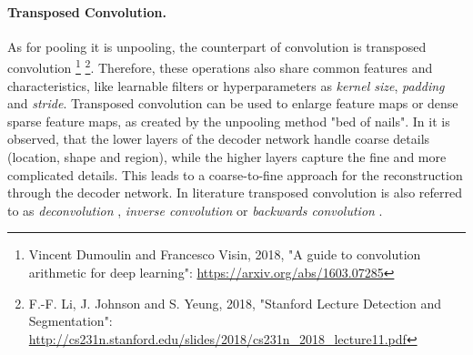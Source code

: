 
\paragraph{Transposed Convolution.}
As for pooling it is unpooling, the counterpart of convolution is transposed convolution
\footnote{Vincent Dumoulin and Francesco Visin, 2018, "A guide to convolution arithmetic for deep learning": \url{https://arxiv.org/abs/1603.07285}}
\footnote{F.-F. Li, J. Johnson and S. Yeung, 2018, "Stanford Lecture Detection and Segmentation": \url{http://cs231n.stanford.edu/slides/2018/cs231n_2018_lecture11.pdf}\label{fn:LJY10_StanfordLecture}}.
Therefore, these operations also share common features and characteristics, like learnable filters or hyperparameters as \textit{kernel size}, \textit{padding} and \textit{stride}.
Transposed convolution can be used to enlarge feature maps or dense sparse feature maps, as created by the unpooling method "bed of nails".
In \cite{NHH15-DeConvNet} it is observed, that the lower layers of the decoder network handle coarse details (\eg location, shape and region), while the higher layers capture the fine and more complicated details.
This leads to a coarse-to-fine approach for the reconstruction through the decoder network.
In literature transposed convolution is also referred to as  \textit{deconvolution} \cite{NHH15-DeConvNet}, \textit{inverse convolution} \cite{Bad17-SegNet} or \textit{backwards convolution} \cite{LSD15-FCN}.

